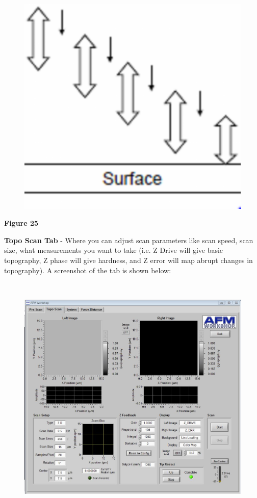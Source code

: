 \documentclass{../lab}
\begin{document}
\begin{figure}[h]
    \centering
    \href{http://dev-physicsadv.pantheon.berkeley.edu/sites/default/files/AFMImages/AFMwoodpecker.png}{\includegraphics[width=0.5\linewidth]{images/AFMwoodpecker.png}}
    \caption{}
    \label{fig:AFMwoodpecker}
\end{figure}

\textbf{Figure 25}

\textbf{Topo Scan Tab} - Where you can adjust scan parameters like scan speed, scan size, what measurements you want to take (i.e. Z Drive will give basic topography, Z phase will give hardness, and Z error will map abrupt changes in topography).  A screenshot of the tab is shown below:

​
\begin{figure}[h]
    \centering
    \href{http://dev-physicsadv.pantheon.berkeley.edu/sites/default/files/AFMImages/toposcan.JPG}{\includegraphics[width=0.5\linewidth]{images/toposcan.JPG}}
    \caption{}
    \label{fig:toposcan}
\end{figure}

​
\end{document}
